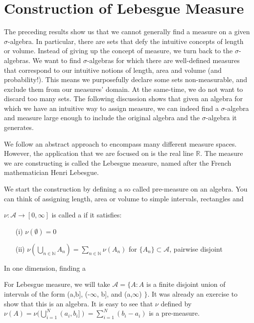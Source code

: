 \documentclass[11pt]{scrartcl}
\begin{document}
\section{Construction of Lebesgue Measure}
The preceding results show us that we cannot generally find a measure on a given $\sigma$-algebra. In particular, there are sets that defy the intuitive concepts of length or volume. Instead of giving up the concept of measure, we turn back to the $\sigma$-algebras. We want to find $\sigma$-algebras for which there are well-defined measures that correspond to our intuitive notions of length, area and volume (and probability!). This means we purposefully declare some sets non-measurable, and exclude them from our measures' domain. At the same-time, we do not want to discard too many sets. 
The following discussion shows that given an algebra for which we have an intuitive way to assign measure, we can indeed find a $\sigma$-algebra and measure large enough to include the original algebra and the $\sigma$-algebra it generates. 

We follow an abstract approach to encompass many different measure spaces. However, the application that we are focused on is the real line $\mathbb{R}$. The measure we are constructing is called the Lebesgue measure, named after the French mathematician Henri Lebesgue. 

We start the construction by defining a so called pre-measure on an algebra. You can think of assigning length, area or volume to simple intervals, rectangles and 

\begin{definition}
$\nu: \mathcal{A} \rightarrow [0,\infty]$ is called a  if it satisfies:
\begin{itemize}
\item[(i)] $\nu(\emptyset) = 0 $
\item[(ii)] $\nu(\bigcup_{n\in \mathbb{N}} A_n) = \sum_{n\in \mathbb{N}} \nu(A_n)$ for $\{A_n\}\subset \mathcal{A}$, pairwise disjoint 
\end{itemize}
\end{definition}

In one dimension, finding a 
\begin{example}
For Lebesgue measure, we will take $\mathcal{A} = \{A: A $ is a finite disjoint union of intervals of the form (a,b], (-$\infty$, b], and (a,$\infty$) $\}$. 
It was already an exercise to show that this is an algebra. It is easy to see that $\nu$ defined by $\nu(A) = \nu(\bigcup_{i=1}^N (a_i,b_i]) = \sum_{i=1}^N (b_i - a_i)$  is a pre-measure.
\end{example}
\end{document}

